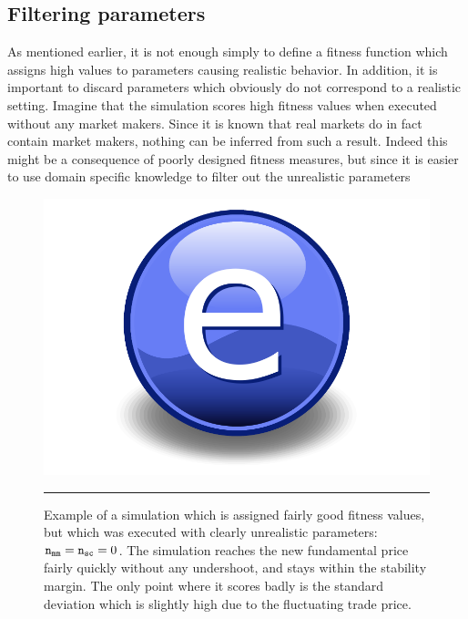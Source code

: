 \subsection{Filtering parameters}\label{section:filtering_parameters}
As mentioned earlier, it is not enough simply to define a fitness function which assigns high values to parameters causing realistic behavior. In addition, it is important to discard parameters which obviously do not correspond to a realistic setting. Imagine that the simulation scores high fitness values when executed without any market makers. Since it is known that real markets do in fact contain market makers, nothing can be inferred from such a result. Indeed this might be a consequence of poorly designed fitness measures, but since it is easier to use domain specific knowledge to filter out the unrealistic parameters

\begin{figure}[htbp]
	\centering
		\includegraphics{Figures/Electron.pdf}
		\rule{35em}{0.5pt}
	\caption{Example of a simulation which is assigned fairly good fitness values, but which was executed with clearly unrealistic parameters: $ \texttt{n}_\texttt{mm}  =  \texttt{n}_\texttt{sc}  = 0$. The simulation reaches the new fundamental price fairly quickly without any undershoot, and stays within the stability margin. The only point where it scores badly is the standard deviation which is slightly high due to the fluctuating trade price.}
	\label{fig:no_marketmakers}
\end{figure}




